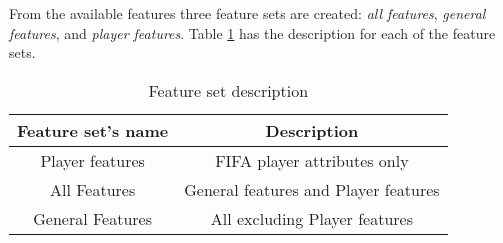 From the available features three feature sets are created: \textit{all features}, \textit{general features}, and \textit{player features}. Table \ref{table:featuresetlist} has the description for each of the feature sets.

\begin{table}
    \caption{Feature set description}
    \begin{tabular}{| c | c|}
        \hline
        Feature set's name & Description \\
        \hline
        Player features & FIFA player attributes only \\
        All Features & General features and Player features \\
        General Features & All excluding Player features \\
        \hline
    \end{tabular}
    \label{table:featuresetlist}
\end{table}